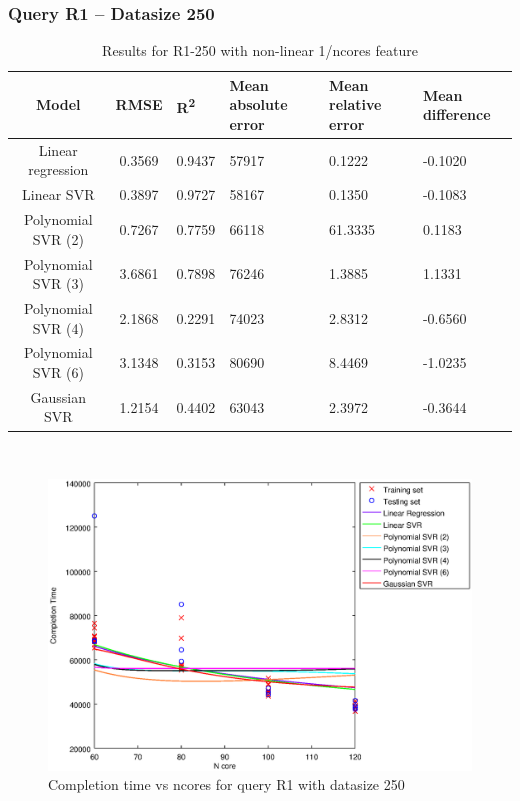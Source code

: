 \documentclass[a4paper,11pt]{article}
\begin{document}
\subsubsection{Query R1 -- Datasize 250}
\begin{table}[H]
	\centering
	\begin{adjustbox}{center}
		\begin{tabular}{c | c M{1.2cm} M{2.5cm} M{2.5cm} M{1.8cm}}
			Model & RMSE & R\textsuperscript{2} & Mean absolute error & Mean relative error & Mean difference \tabularnewline
			\hline
			Linear regression & 0.3569 & 0.9437 &  57917 & 0.1222 & -0.1020 \\
			Linear SVR & 0.3897 & 0.9727 &  58167 & 0.1350 & -0.1083 \\
			Polynomial SVR (2) & 0.7267 & 0.7759 &  66118 & 61.3335 & 0.1183 \\
			Polynomial SVR (3) & 3.6861 & 0.7898 &  76246 & 1.3885 & 1.1331 \\
			Polynomial SVR (4) & 2.1868 & 0.2291 &  74023 & 2.8312 & -0.6560 \\
			Polynomial SVR (6) & 3.1348 & 0.3153 &  80690 & 8.4469 & -1.0235 \\
			Gaussian SVR & 1.2154 & 0.4402 &  63043 & 2.3972 & -0.3644 \\
		\end{tabular}
	\end{adjustbox}
	\\
	\caption{Results for R1-250 with non-linear 1/ncores feature}
	\label{table_R1_prediction_all}
\end{table}

\begin {figure}[hbtp]
\centering
\includegraphics[width=\textwidth]{output/R1_250_NO_72_90_1_OVER_NCORES/plot_R1_250.eps}
\caption {Completion time vs ncores for query R1 with datasize 250}
\end {figure}
\end{document}
